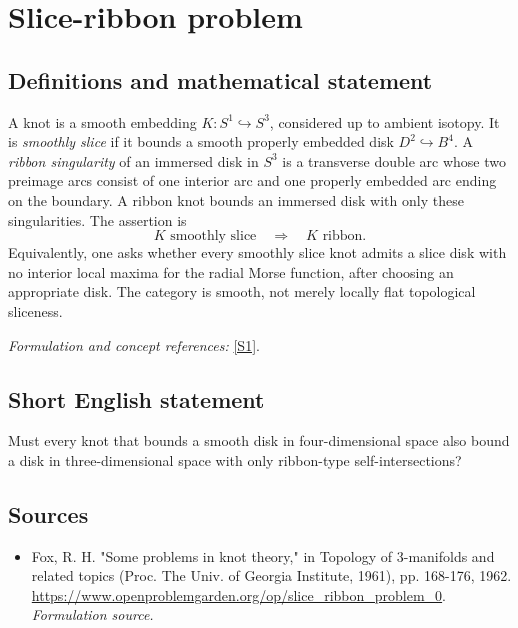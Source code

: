 \documentclass[11pt]{article}
\begin{document}
\section*{\texorpdfstring{Slice-ribbon problem}{Slice-ribbon problem}}\label{3412}
\subsection{Definitions and mathematical statement}
A knot is a smooth embedding $K:S^1\hookrightarrow S^3$, considered up to ambient isotopy. It is \emph{smoothly slice} if it bounds a smooth properly embedded disk $D^2\hookrightarrow B^4$. A \emph{ribbon singularity} of an immersed disk in $S^3$ is a transverse double arc whose two preimage arcs consist of one interior arc and one properly embedded arc ending on the boundary. A ribbon knot bounds an immersed disk with only these singularities. The assertion is
\[
 K\text{ smoothly slice}\quad\Longrightarrow\quad K\text{ ribbon}.
\]
Equivalently, one asks whether every smoothly slice knot admits a slice disk with no interior local maxima for the radial Morse function, after choosing an appropriate disk. The category is smooth, not merely locally flat topological sliceness.
\par\smallskip\textit{Formulation and concept references:} \href{https://www.openproblemgarden.org/op/slice_ribbon_problem_0}{[S1]}.

\subsection{Short English statement}
Must every knot that bounds a smooth disk in four-dimensional space also bound a disk in three-dimensional space with only ribbon-type self-intersections?
\subsection{Sources}
\begin{itemize}
\item[S1]Fox, R. H. "Some problems in knot theory," in Topology of 3-manifolds and related topics (Proc. The Univ. of Georgia Institute, 1961), pp. 168-176, 1962.
\url{https://www.openproblemgarden.org/op/slice_ribbon_problem_0}.
\textit{Formulation source.}
\end{itemize}
\end{document}
